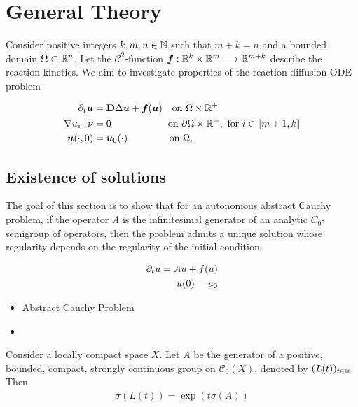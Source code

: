 \section{General Theory}

Consider positive integers $k, m, n \in \mathbb{N}$ such that $m+k = n$ and a bounded domain $\Omega \subset \mathbb{R}^{n}$. Let the $\mathcal C^2$-function $\bm f : \mathbb{R}^k \times \mathbb{R}^m \longrightarrow \mathbb{R}^{m+k}$ describe the reaction kinetics. We aim to investigate properties of the reaction-diffusion-ODE problem
 
\begin{align}
	\partial_t\bm{u}  &= \bm{\mathrm D} \Delta \bm{u} + \bm{f}(\bm{u}) \quad \text{on } \Omega \times \mathbb R^{+} \notag \\  \nabla u_i \cdot \nu &= 0 \qquad\qquad\qquad\! \text{on } \partial\Omega \times \mathbb R^{+}, \text{ for } i \in [\![ m+1, k ]\!]\\
	\bm{u}(\cdot, 0) &= \bm{u}_0(\cdot) \qquad\qquad\; \text{on } \Omega, \notag
\end{align}


\subsection{Existence of solutions}

The goal of this section is to show that for an autonomous abstract Cauchy problem, if the operator $A$ is the infinitesimal generator of an analytic $C_0$-semigroup of operators, then the problem admits a unique solution whose regularity depends on the regularity of the initial condition.

\begin{definition} 
	\begin{align}
		\partial_t u = Au + f(u) \notag \\
		u(0) = u_0 \notag
	\end{align}
\end{definition}

\begin{itemize}
	\item Abstract Cauchy Problem
	\item 
\end{itemize}


\begin{theorem} 
	Consider a locally compact space $X$. Let $A$ be the generator of a positive, bounded, compact, strongly continuous group on $\mathcal C_0(X)$, denoted by $(L(t))_{t\in\mathbb{R}}.$ Then
	$$\sigma(L(t)) = \overline{\exp(t \sigma(A))}$$
\end{theorem}

